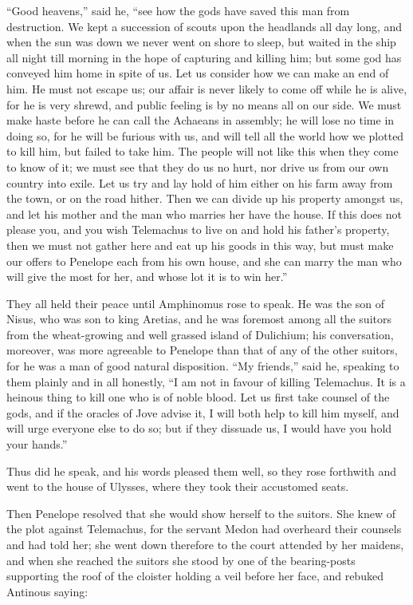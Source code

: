 “Good heavens,” said he, “see how the gods have saved this man from
destruction. We kept a succession of scouts upon the headlands all day long,
and when the sun was down we never went on shore to sleep, but waited in the
ship all night till morning in the hope of capturing and killing him; but some
god has conveyed him home in spite of us. Let us consider how we can make an
end of him. He must not escape us; our affair is never likely to come off while
he is alive, for he is very shrewd, and public feeling is by no means all on
our side. We must make haste before he can call the Achaeans in assembly; he
will lose no time in doing so, for he will be furious with us, and will tell
all the world how we plotted to kill him, but failed to take him. The people
will not like this when they come to know of it; we must see that they do us no
hurt, nor drive us from our own country into exile. Let us try and lay hold of
him either on his farm away from the town, or on the road hither. Then we can
divide up his property amongst us, and let his mother and the man who marries
her have the house. If this does not please you, and you wish Telemachus to
live on and hold his father’s property, then we must not gather here and eat up
his goods in this way, but must make our offers to Penelope each from his own
house, and she can marry the man who will give the most for her, and whose lot
it is to win her.”

They all held their peace until Amphinomus rose to speak. He was the son of
Nisus, who was son to king Aretias, and he was foremost among all the suitors
from the wheat-growing and well grassed island of Dulichium; his conversation,
moreover, was more agreeable to Penelope than that of any of the other suitors,
for he was a man of good natural disposition. “My friends,” said he, speaking
to them plainly and in all honestly, “I am not in favour of killing Telemachus.
It is a heinous thing to kill one who is of noble blood. Let us first take
counsel of the gods, and if the oracles of Jove advise it, I will both help to
kill him myself, and will urge everyone else to do so; but if they dissuade us,
I would have you hold your hands.”

Thus did he speak, and his words pleased them well, so they rose forthwith and
went to the house of Ulysses, where they took their accustomed seats.

Then Penelope resolved that she would show herself to the suitors. She knew of
the plot against Telemachus, for the servant Medon had overheard their counsels
and had told her; she went down therefore to the court attended by her maidens,
and when she reached the suitors she stood by one of the bearing-posts
supporting the roof of the cloister holding a veil before her face, and rebuked
Antinous saying:

